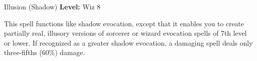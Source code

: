 {Illusion (Shadow)}
{
	\textbf{Level:}
	Wiz 8\\
}
{
	This spell functions like shadow evocation, except that it enables you to create partially real, illusory versions of sorcerer or wizard evocation spells of 7th level or lower. If recognized as a greater shadow evocation, a damaging spell deals only three-fifths (60\%) damage.

}
